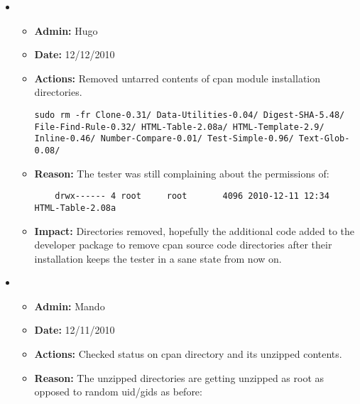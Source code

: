\documentclass[12pt]{article}
\begin{document}
\begin{itemize}
\item
\begin{itemize}
\item[] {\bf Admin:} Hugo
\item[] {\bf Date:} 12/12/2010 
\item[] {\bf Actions:} Removed untarred contents of cpan module installation directories.
\begin{verbatim}
sudo rm -fr Clone-0.31/ Data-Utilities-0.04/ Digest-SHA-5.48/ File-Find-Rule-0.32/ HTML-Table-2.08a/ HTML-Template-2.9/ Inline-0.46/ Number-Compare-0.01/ Test-Simple-0.96/ Text-Glob-0.08/
\end{verbatim}
\item[] {\bf Reason:} The tester was still complaining about the permissions of:
\begin{verbatim}
	drwx------ 4 root     root       4096 2010-12-11 12:34 HTML-Table-2.08a
\end{verbatim}

\item[] {\bf Impact:} Directories removed, hopefully the additional
  code added to the developer package to remove cpan source code
  directories after their installation keeps the tester in a sane
  state from now on.
\end{itemize}


\item
\begin{itemize}
\item[] {\bf Admin:} Mando
\item[] {\bf Date:} 12/11/2010 
\item[] {\bf Actions:} Checked status on cpan directory and its unzipped contents.
\item[] {\bf Reason:} The unzipped directories are getting unzipped as root as opposed to random uid/gids as before:


\end{itemize}
\end{itemize}
\end{document}
